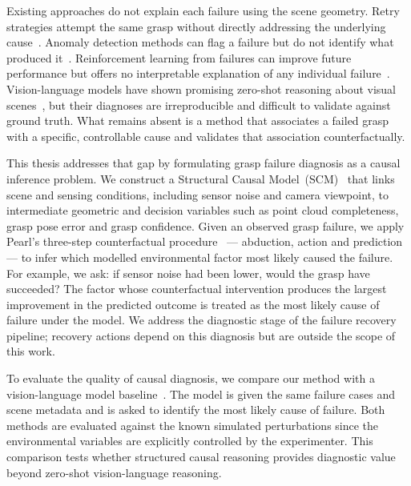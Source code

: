 \documentclass[journal]{IEEEtran}
\begin{document}
Existing approaches do not explain each failure using the scene
geometry.  Retry strategies attempt the same grasp without directly
addressing the underlying cause~\cite{hsiao2010contact}.  Anomaly
detection methods can flag a failure but do not identify what
produced it~\cite{park2018multimodal}.  Reinforcement learning from
failures can improve future performance but offers no interpretable
explanation of any individual failure~\cite{levine2018learning,
kalashnikov2018scalable}.  Vision-language models have shown
promising zero-shot reasoning about visual scenes~\cite{ahn2022saycan,
driess2023palm}, but their diagnoses are irreproducible and difficult
to validate against ground truth.  What remains absent is a method
that associates a failed grasp with a specific, controllable cause
and validates that association counterfactually.

This thesis addresses that gap by formulating grasp failure
diagnosis as a causal inference problem.  We construct a Structural
Causal Model~(SCM)~\cite{pearl2009causality} that links scene and
sensing conditions, including sensor noise and camera viewpoint, to
intermediate geometric and decision variables such as point cloud
completeness, grasp pose error and grasp confidence.  Given an
observed grasp failure, we apply Pearl's three-step counterfactual
procedure~\cite{pearl2018book} --- abduction, action and prediction
--- to infer which modelled environmental factor most likely caused
the failure.  For example, we ask: if sensor noise had been lower,
would the grasp have succeeded?  The factor whose counterfactual
intervention produces the largest improvement in the predicted
outcome is treated as the most likely cause of failure under the
model.  We address the diagnostic stage of the failure recovery
pipeline; recovery actions depend on this diagnosis but are outside
the scope of this work.

To evaluate the quality of causal diagnosis, we compare our method
with a vision-language model baseline~\cite{ahn2022saycan}.  The
model is given the same failure cases and scene metadata and is
asked to identify the most likely cause of failure.  Both methods
are evaluated against the known simulated perturbations since the
environmental variables are explicitly controlled by the experimenter.
This comparison tests whether structured causal reasoning provides
diagnostic value beyond zero-shot vision-language reasoning.
\end{document}
